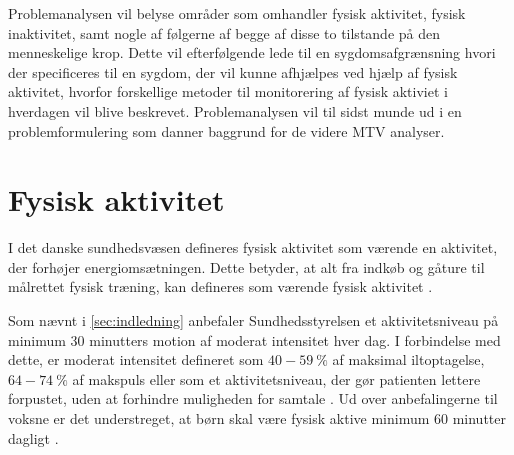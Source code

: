 Problemanalysen vil belyse områder som omhandler fysisk aktivitet, fysisk inaktivitet, samt nogle af følgerne af begge af disse to tilstande på den menneskelige krop. Dette vil efterfølgende lede til en sygdomsafgrænsning hvori der specificeres til en sygdom, der vil kunne afhjælpes ved hjælp af fysisk aktivitet, hvorfor forskellige metoder til monitorering af fysisk aktiviet i hverdagen vil blive beskrevet. Problemanalysen vil til sidst munde ud i en problemformulering som danner baggrund for de videre MTV analyser.

\section{Fysisk aktivitet}\label{sec:prob_fysaktiv}

I det danske sundhedsvæsen defineres fysisk aktivitet som værende en aktivitet, der forhøjer energiomsætningen. Dette betyder, at alt fra indkøb og gåture til målrettet fysisk træning, kan defineres som værende fysisk aktivitet \citep{motionsraad2007, terkelsen2015}.

Som nævnt i \autoref{sec:indledning} anbefaler Sundhedsstyrelsen et aktivitetsniveau på minimum 30 minutters motion af moderat intensitet hver dag. I forbindelse med dette, er moderat intensitet defineret som $40-59~\%$ af maksimal iltoptagelse, $64-74~\%$ af makspuls eller som et aktivitetsniveau, der gør patienten lettere forpustet, uden at forhindre muligheden for samtale \citep{motionsraad2007}.
Ud over anbefalingerne til voksne er det understreget, at børn skal være fysisk aktive minimum 60 minutter dagligt \citep{pedersen2011}. 
